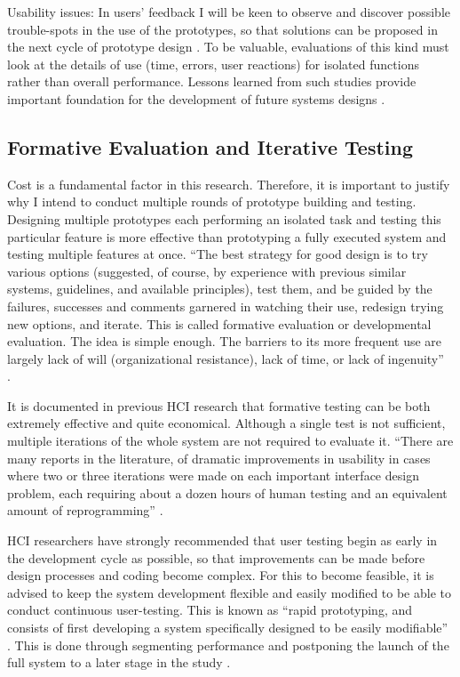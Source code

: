 Usability issues: In users’ feedback I will be keen to observe and discover possible trouble-spots in the use of the prototypes, so that solutions can be proposed in the next cycle of prototype design \parencite{Klasnja2011}. To be valuable, evaluations of this kind must look at the details of use (time, errors, user reactions) for isolated functions rather than overall performance. Lessons learned from such studies provide important foundation for the development of future systems designs \parencite{Cox2008}.

\subsection{Formative Evaluation and Iterative Testing}

Cost is a fundamental factor in this research. Therefore, it is important to justify why I intend to conduct multiple rounds of prototype building and testing. Designing multiple prototypes each performing an isolated task and testing this particular feature is more effective than prototyping a fully executed system and testing multiple features at once. ``The best strategy for good design is to try various options (suggested, of course, by experience with previous similar systems, guidelines, and available principles), test them, and be guided by the failures, successes and comments garnered in watching their use, redesign trying new options, and iterate. This is called formative evaluation or developmental evaluation. The idea is simple enough. The barriers to its more frequent use are largely lack of will (organizational resistance), lack of time, or lack of ingenuity'' \parencite{Dix2004}. 

It is documented in previous HCI research \parencite{Cox2008} \parencite{Lazar2010} that formative testing can be both extremely effective and quite economical. Although a single test is not sufficient, multiple iterations of the whole system are not required to evaluate it. ``There are many reports in the literature, of dramatic improvements in usability in cases where two or three iterations were made on each important interface design problem, each requiring about a dozen hours of human testing and an equivalent amount of reprogramming'' \parencite{Georges2004}.

HCI researchers \parencite{Cox2008} \parencite{Lazar2010} have strongly recommended that user testing begin as early in the development cycle as possible, so that improvements can be made before design processes and coding become complex. For this to become feasible, it is advised to keep the system development flexible and easily modified to be able to conduct continuous user-testing. This is known as ``rapid prototyping, and consists of first developing a system specifically designed to be easily modifiable'' \parencite{Wania2006}. This is done through segmenting performance and postponing the launch of the full system to a later stage in the study \parencite{Dix2004} \parencite{Georges2004}.

